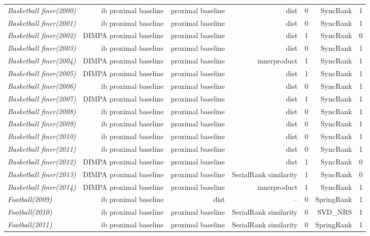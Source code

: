 \documentclass[nohyperref]{article}
\theoremstyle{plain}
\theoremstyle{definition}
\theoremstyle{remark}
\begin{document}
\begin{table*}[!ht]
{\begin{tabular}{lrrrrrr}
			{\it Basketball finer(2000)} & ib proximal baseline & proximal baseline & dist & 0 & SyncRank & 1 \\
			{\it Basketball finer(2001)} & ib proximal baseline & proximal baseline & dist & 0 & SyncRank & 1 \\
			{\it Basketball finer(2002)} & DIMPA proximal baseline & proximal baseline & dist & 1 & SyncRank & 0 \\
			{\it Basketball finer(2003)} & ib proximal baseline & proximal baseline & dist & 0 & SyncRank & 1 \\
			{\it Basketball finer(2004)} & DIMPA proximal baseline & proximal baseline & innerproduct & 1 & SyncRank & 1 \\
			{\it Basketball finer(2005)} & DIMPA proximal baseline & proximal baseline & dist & 1 & SyncRank & 1 \\
			{\it Basketball finer(2006)} & ib proximal baseline & proximal baseline & dist & 0 & SyncRank & 1 \\
			{\it Basketball finer(2007)} & DIMPA proximal baseline & proximal baseline & dist & 1 & SyncRank & 1 \\
			{\it Basketball finer(2008)} & ib proximal baseline & proximal baseline & dist & 0 & SyncRank & 1 \\
			{\it Basketball finer(2009)} & ib proximal baseline & proximal baseline & dist & 0 & SyncRank & 1 \\
			{\it Basketball finer(2010)} & ib proximal baseline & proximal baseline & dist & 0 & SyncRank & 1 \\
			{\it Basketball finer(2011)} & ib proximal baseline & proximal baseline & dist & 0 & SyncRank & 1 \\
			{\it Basketball finer(2012)} & DIMPA proximal baseline & proximal baseline & dist & 1 & SyncRank & 0 \\
			{\it Basketball finer(2013)} & DIMPA proximal baseline & proximal baseline & SerialRank similarity & 1 & SyncRank & 0 \\
			{\it Basketball finer(2014)} & DIMPA proximal baseline & proximal baseline & innerproduct & 1 & SyncRank & 1 \\
			{\it Football(2009)} & ib proximal baseline & dist & -- & 0 & SpringRank & 1 \\
			{\it Football(2010)} & ib proximal baseline & proximal baseline & SerialRank similarity & 0 & SVD\_NRS & 1 \\
			{\it Football(2011)} & ib proximal baseline & proximal baseline & SerialRank similarity & 0 & SpringRank & 1 \\

\end{tabular}}
\end{table*}
\end{document}
